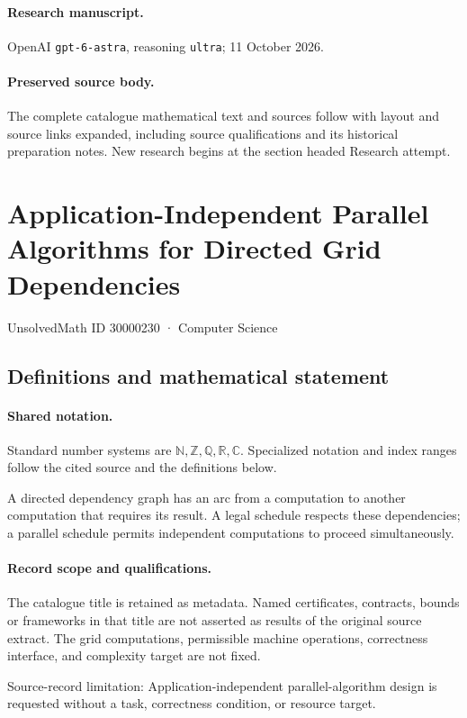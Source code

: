 \documentclass[11pt]{article}
\begin{document}
\paragraph{Research manuscript.} OpenAI \texttt{gpt-6-astra}, reasoning \texttt{ultra}; 11 October 2026.
\paragraph{Preserved source body.} The complete catalogue mathematical text and sources follow with layout and source links expanded, including source qualifications and its historical preparation notes. New research begins at the section headed Research attempt.

\section{Application-Independent Parallel Algorithms for Directed Grid Dependencies}\label{30000230}
{\small UnsolvedMath ID 30000230 · Computer Science}
\subsection{Definitions and mathematical statement}

\paragraph{Shared notation.}Standard number systems are $\mathbb N,\mathbb Z,\mathbb Q,\mathbb R,\mathbb C$. Specialized notation and index ranges follow the cited source and the definitions below.


A directed dependency graph has an arc from a computation to another computation that requires its result. A legal schedule respects these dependencies; a parallel schedule permits independent computations to proceed simultaneously.
\paragraph{Record scope and qualifications.}
The catalogue title is retained as metadata. Named certificates, contracts, bounds or frameworks in that title are not asserted as results of the original source extract.
The grid computations, permissible machine operations, correctness interface, and complexity target are not fixed.

Source-record limitation: Application-independent parallel-algorithm design is requested without a task, correctness condition, or resource target.
\end{document}

